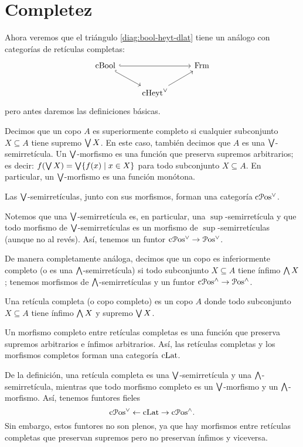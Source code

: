 \section{Completez}
\label{ss:completez}
Ahora veremos que el triángulo \eqref{diag:bool-heyt-dlat}
tiene un análogo con categorías de retículas completas:
\begin{equation} \label{diag:cbool-cheyt-frm}
\begin{tikzcd}
  \CBA \ar[dr,hook] \ar[rr,hook] &               & \Frm \\
                                  & \cHeyt \ar[ur]
\end{tikzcd}
\end{equation}
pero antes daremos las definiciones básicas.

\begin{definition}
  Decimos que un copo $A$ es superiormente completo
  si cualquier subconjunto $X\subseteq A$ tiene supremo $\bigvee X$.
  En este caso, también decimos que $A$ es una $\bigvee$-semirretícula.
  Un $\bigvee$-morfismo es una función que preserva supremos arbitrarios;
  es decir: $f(\bigvee X)=\bigvee\{f(x)\mid x\in X\}$
  para todo subconjunto $X\subseteq A$. En particular, un
  $\bigvee$-morfismo es una función monótona.

  Las $\bigvee$-semirretículas, junto con sus morfismos,
  forman una categoría $\mathrm{c}\mathcal{P}\mathrm{os}^\vee$.
\end{definition}
Notemos que una $\bigvee$-semirretícula es, en particular,
una $\sup$-semirretícula y que todo morfismo de $\bigvee$-semirretículas es
un morfismo de $\sup$-semirretículas (aunque no al revés).
Así, tenemos un funtor $\mathrm{c}\mathcal{P}\mathrm{os}^\vee\to\mathcal{P}\mathrm{os}^\vee$.

De manera completamente análoga, decimos que un copo es
inferiormente completo (o es una $\bigwedge$-semirretícula)
si todo subconjunto $X\subseteq A$ tiene ínfimo $\bigwedge X$; tenemos
morfismos de $\bigwedge$-semirretículas y un funtor
$\mathrm{c}\mathcal{P}\mathrm{os}^\wedge\to\mathcal{P}\mathrm{os}^{\wedge}$.

\begin{definition}
  Una retícula completa (o copo completo) es un copo $A$
  donde todo subconjunto $X\subseteq A$ tiene ínfimo $\bigwedge X$ y
  supremo $\bigvee X$.

  Un morfismo completo entre retículas completas es una función que
  preserva supremos arbitrarios e ínfimos arbitrarios.
  Así, las retículas completas y los morfismos completos forman una
  categoría $\mathrm{cLat}$.
\end{definition}
De la definición, una retícula completa es una
$\bigvee$-semirretícula y una $\bigwedge$-semirretícula, mientras que todo
morfismo completo es un $\bigvee$-morfismo y un $\bigwedge$-morfismo.
Así, tenemos funtores fieles
\begin{equation}
  \mathrm{c}\mathcal{P}\mathrm{os}^\vee \leftarrow \mathrm{cLat} \to \mathrm{c}\mathcal{P}\mathrm{os}^\wedge.
\end{equation}
Sin embargo, estos funtores no son plenos, ya que hay morfismos entre
retículas completas que preservan supremos pero no preservan ínfimos y
viceversa.

